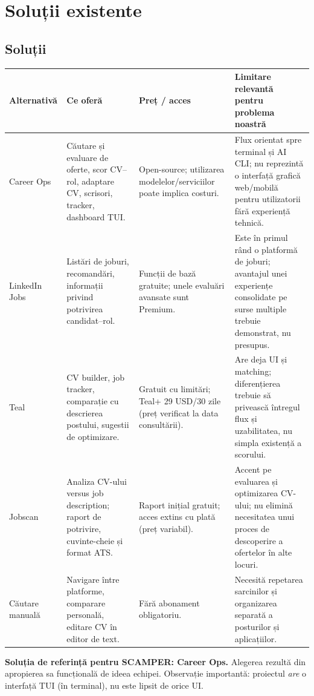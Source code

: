 \documentclass[12pt,a4paper]{article}
\begin{document}
\section{Soluții existente}
\subsection{Soluții}
\small
\begin{longtable}{p{2.35cm}p{3.4cm}p{2.05cm}p{5.4cm}}
\toprule
\textbf{Alternativă} & \textbf{Ce oferă} & \textbf{Preț / acces} & \textbf{Limitare relevantă pentru problema noastră}\\\midrule\endhead
Career Ops & Căutare și evaluare de oferte, scor CV--rol, adaptare CV, scrisori, tracker, dashboard TUI. & Open-source; utilizarea modelelor/serviciilor poate implica costuri. & Flux orientat spre terminal și AI CLI; nu reprezintă o interfață grafică web/mobilă pentru utilizatorii fără experiență tehnică.\\
LinkedIn Jobs & Listări de joburi, recomandări, informații privind potrivirea candidat--rol. & Funcții de bază gratuite; unele evaluări avansate sunt Premium. & Este în primul rând o platformă de joburi; avantajul unei experiențe consolidate pe surse multiple trebuie demonstrat, nu presupus.\\
Teal & CV builder, job tracker, comparație cu descrierea postului, sugestii de optimizare. & Gratuit cu limitări; Teal+ 29 USD/30 zile (preț verificat la data consultării). & Are deja UI și matching; diferențierea trebuie să privească întregul flux și uzabilitatea, nu simpla existență a scorului.\\
Jobscan & Analiza CV-ului versus job description; raport de potrivire, cuvinte-cheie și format ATS. & Raport inițial gratuit; acces extins cu plată (preț variabil). & Accent pe evaluarea și optimizarea CV-ului; nu elimină necesitatea unui proces de descoperire a ofertelor în alte locuri.\\
Căutare manuală & Navigare între platforme, comparare personală, editare CV în editor de text. & Fără abonament obligatoriu. & Necesită repetarea sarcinilor și organizarea separată a posturilor și aplicațiilor.\\
\bottomrule
\end{longtable}
\normalsize
\textbf{Soluția de referință pentru SCAMPER: Career Ops.} Alegerea rezultă din apropierea sa funcțională de ideea echipei. Observație importantă: proiectul \emph{are} o interfață TUI (în terminal), nu este lipsit de orice UI.
\end{document}
